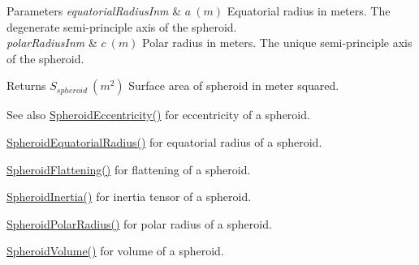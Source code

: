\begin{DoxyParams}{Parameters}
{\em equatorial\+Radius\+Inm} & $ a\ (m)$ Equatorial radius in meters. The degenerate semi-\/principle axis of the spheroid. \\
\hline
{\em polar\+Radius\+Inm} & $ c\ (m)$ Polar radius in meters. The unique semi-\/principle axis of the spheroid. \\
\hline
\end{DoxyParams}
\begin{DoxyReturn}{Returns}
$ S_{spheroid}\ (m^2)$ Surface area of spheroid in meter squared. 
\end{DoxyReturn}
\begin{DoxySeeAlso}{See also}
\mbox{\hyperlink{group___e_g_x_math-_geometry-3_d-_spheroid-_eccentricity_gab45680528a41bb7a5e15ddc0059156dd}{Spheroid\+Eccentricity()}} for eccentricity of a spheroid. 

\mbox{\hyperlink{group___e_g_x_math-_geometry-3_d-_spheroid-_equatorial_radius_ga1cbe564fee1b509c622d1c6d276158cd}{Spheroid\+Equatorial\+Radius()}} for equatorial radius of a spheroid. 

\mbox{\hyperlink{group___e_g_x_math-_geometry-3_d-_spheroid-_flattening_ga05e3be91f5f7fbaa9371687aa3834179}{Spheroid\+Flattening()}} for flattening of a spheroid. 

\mbox{\hyperlink{group___e_g_x_math-_geometry-3_d-_spheroid-_inertia_ga4a6085f1b3504bd682ee6818542ae09e}{Spheroid\+Inertia()}} for inertia tensor of a spheroid. 

\mbox{\hyperlink{group___e_g_x_math-_geometry-3_d-_spheroid-_polar_radius_gad4791a46a7efe39c63c03d2366fdd3d2}{Spheroid\+Polar\+Radius()}} for polar radius of a spheroid. 

\mbox{\hyperlink{group___e_g_x_math-_geometry-3_d-_spheroid-_volume_ga12125484235e94b8f2580f3476b05b92}{Spheroid\+Volume()}} for volume of a spheroid. 
\end{DoxySeeAlso}
